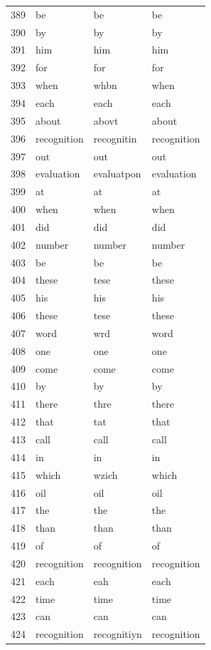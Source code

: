 \begin{longtable}{clll}
    389 & be & be & be \\
    390 & by & by & by \\
    391 & him & him & him \\
    392 & for & for & for \\
    393 & when & whbn & when \\
    394 & each & each & each \\
    395 & about & abovt & about \\
    396 & recognition & recognitin & recognition \\
    397 & out & out & out \\
    398 & evaluation & evaluatpon & evaluation \\
    399 & at & at & at \\
    400 & when & when & when \\
    401 & did & did & did \\
    402 & number & number & number \\
    403 & be & be & be \\
    404 & these & tese & these \\
    405 & his & his & his \\
    406 & these & tese & these \\
    407 & word & wrd & word \\
    408 & one & one & one \\
    409 & come & come & come \\
    410 & by & by & by \\
    411 & there & thre & there \\
    412 & that & tat & that \\
    413 & call & call & call \\
    414 & in & in & in \\
    415 & which & wzich & which \\
    416 & oil & oil & oil \\
    417 & the & the & the \\
    418 & than & than & than \\
    419 & of & of & of \\
    420 & recognition & recognition & recognition \\
    421 & each & eah & each \\
    422 & time & time & time \\
    423 & can & can & can \\
    424 & recognition & recognitiyn & recognition \\

\end{longtable}
